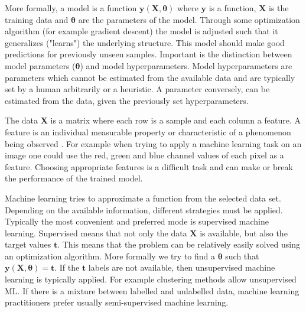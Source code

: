 \documentclass[draft,final,oneside]{vutinfth} %
\begin{document}
More formally, a model is a function $\boldsymbol{y}(\boldsymbol{X}, \boldsymbol{\theta})$ where $\boldsymbol{y}$ is a function, $\boldsymbol{X}$ is the training data and $\boldsymbol{\theta}$ are the parameters of the model. Through some optimization algorithm (for example gradient descent) the model is adjusted such that it generalizes ("learns") the underlying structure. This model should make good predictions for previously unseen samples. Important is the distinction between model parameters ($\boldsymbol{\theta}$) and model hyperparameters. Model hyperparameters are parameters which cannot be estimated from the available data and are typically set by a human arbitrarily or a heuristic. A parameter conversely, can be estimated from the data, given the previously set hyperparameters.

The data $\boldsymbol{X}$ is a matrix where each row is a sample and each column a feature. A feature is an individual measurable property or characteristic of a phenomenon being observed \cite{bishop}. For example when trying to apply a machine learning task on an image one could use the red, green and blue channel values of each pixel as a feature. Choosing appropriate features is a difficult task and can make or break the performance of the trained model.


Machine learning tries to approximate a function from the selected data set. Depending on the available information, different strategies must be applied. Typically the most convenient and preferred mode is supervised machine learning. Supervised means that not only the data $\boldsymbol{X}$ is available, but also the target values $\boldsymbol{t}$. This means that the problem can be relatively easily solved using an optimization algorithm. More formally we try to find a $\boldsymbol{\theta}$ such that $\boldsymbol{y}(\boldsymbol{X}, \boldsymbol{\theta}) = \boldsymbol{t}$. If the $\boldsymbol{t}$ labels are not available, then unsupervised machine learning is typically applied. For example clustering methods allow unsupervised ML. If there is a mixture between labelled and unlabelled data, machine learning practitioners prefer usually semi-supervised machine learning.
\end{document}
